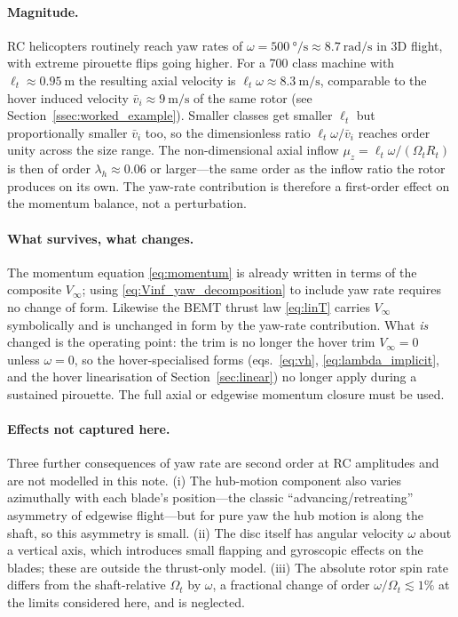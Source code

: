 \documentclass[11pt,a4paper]{article}
\newcommand{\OmegaT}{\Omega_t}
\newcommand{\Rt}{R_t}
\newcommand{\bvi}{\bar{v}_i}
\begin{document}
\paragraph{Magnitude.}
RC helicopters routinely reach yaw rates of \(\omega=\SI{500}{\degree\per\second}
\approx \SI{8.7}{\radian\per\second}\) in 3D flight, with extreme
pirouette flips going higher. For a 700 class machine with
\(\ell_t\approx\SI{0.95}{\metre}\) the resulting axial velocity is
\(\ell_t\omega\approx\SI{8.3}{\metre\per\second}\), comparable to
the hover induced velocity \(\bvi\approx\SI{9}{\metre\per\second}\)
of the same rotor (see Section~\ref{ssec:worked_example}). Smaller
classes get smaller \(\ell_t\) but proportionally smaller \(\bvi\) too,
so the dimensionless ratio \(\ell_t\omega/\bvi\) reaches order unity
across the size range. The non-dimensional axial inflow
\(\mu_z=\ell_t\omega/(\OmegaT\Rt)\) is then of order
\(\lambda_h\approx 0.06\) or larger---the same order as the inflow
ratio the rotor produces on its own. The yaw-rate contribution is
therefore a first-order effect on the momentum balance, not a
perturbation.

\paragraph{What survives, what changes.}
The momentum equation \eqref{eq:momentum} is already written in terms of
the composite \(V_\infty\); using \eqref{eq:Vinf_yaw_decomposition} to
include yaw rate requires no change of form. Likewise the BEMT thrust
law \eqref{eq:linT} carries \(V_\infty\) symbolically and is unchanged
in form by the yaw-rate contribution. What \emph{is} changed is the
operating point: the trim is no longer the hover trim \(V_\infty=0\)
unless \(\omega=0\), so the hover-specialised forms
(eqs.~\eqref{eq:vh}, \eqref{eq:lambda_implicit}, and the hover
linearisation of Section~\ref{sec:linear}) no longer apply during a
sustained pirouette. The full axial or edgewise momentum closure must
be used.

\paragraph{Effects not captured here.}
Three further consequences of yaw rate are second order at RC
amplitudes and are not modelled in this note. (i) The hub-motion
component also varies azimuthally with each blade's position---the
classic ``advancing/retreating'' asymmetry of edgewise flight---but
for pure yaw the hub motion is along the shaft, so this asymmetry is
small. (ii) The disc itself has angular velocity \(\omega\) about a
vertical axis, which introduces small flapping and gyroscopic effects
on the blades; these are outside the thrust-only model. (iii) The
absolute rotor spin rate differs from the shaft-relative
\(\OmegaT\) by \(\omega\), a fractional change of order
\(\omega/\OmegaT\lesssim 1\%\) at the limits considered here, and
is neglected.
\end{document}
